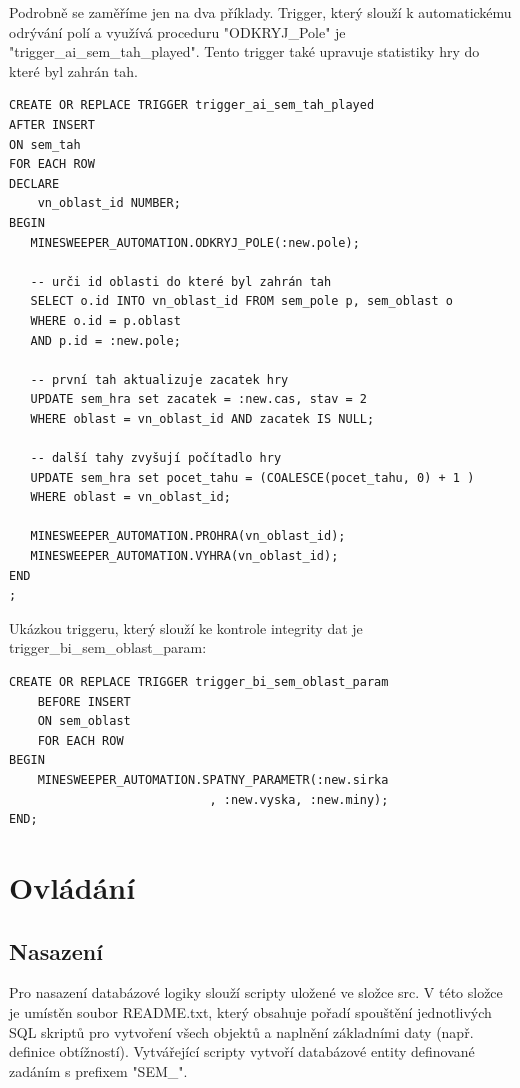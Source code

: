 \documentclass[12pt, a4paper]{article}
\begin{document}
Podrobně se zaměříme jen na dva příklady. Trigger, který slouží k automatickému odrývání polí a využívá proceduru "ODKRYJ\_Pole" je "trigger\_ai\_sem\_tah\_played". Tento trigger také upravuje statistiky hry do které byl zahrán tah. 

\begin{verbatim}
CREATE OR REPLACE TRIGGER trigger_ai_sem_tah_played
AFTER INSERT 
ON sem_tah
FOR EACH ROW
DECLARE 
    vn_oblast_id NUMBER;
BEGIN
   MINESWEEPER_AUTOMATION.ODKRYJ_POLE(:new.pole);
   
   -- urči id oblasti do které byl zahrán tah
   SELECT o.id INTO vn_oblast_id FROM sem_pole p, sem_oblast o
   WHERE o.id = p.oblast
   AND p.id = :new.pole;
   
   -- první tah aktualizuje zacatek hry
   UPDATE sem_hra set zacatek = :new.cas, stav = 2 
   WHERE oblast = vn_oblast_id AND zacatek IS NULL;
   
   -- další tahy zvyšují počítadlo hry
   UPDATE sem_hra set pocet_tahu = (COALESCE(pocet_tahu, 0) + 1 ) 
   WHERE oblast = vn_oblast_id;
   
   MINESWEEPER_AUTOMATION.PROHRA(vn_oblast_id);
   MINESWEEPER_AUTOMATION.VYHRA(vn_oblast_id);
END
;
\end{verbatim}

Ukázkou triggeru, který slouží ke kontrole integrity dat je trigger\_bi\_sem\_oblast\_param:

\begin{verbatim}
CREATE OR REPLACE TRIGGER trigger_bi_sem_oblast_param
	BEFORE INSERT
 	ON sem_oblast
 	FOR EACH ROW
BEGIN
    MINESWEEPER_AUTOMATION.SPATNY_PARAMETR(:new.sirka
    						, :new.vyska, :new.miny);
END;
\end{verbatim}

\section{Ovládání}

\subsection{Nasazení}

Pro nasazení databázové logiky slouží scripty uložené ve složce src. V této složce je umístěn soubor README.txt, který obsahuje pořadí spouštění jednotlivých SQL skriptů pro vytvoření všech objektů a naplnění základními daty (např. definice obtížností). Vytvářející scripty vytvoří databázové entity definované zadáním s prefixem "SEM\_".
\end{document}
